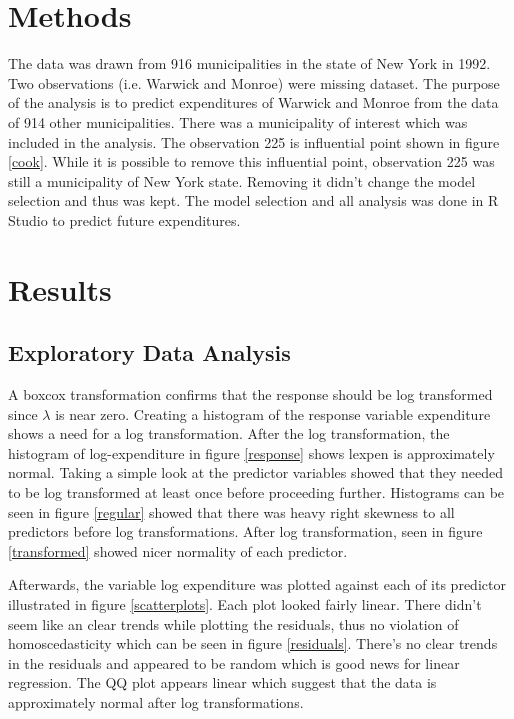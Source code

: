 \documentclass{article}\usepackage[]{graphicx}\usepackage[]{color}
\begin{document}
\section{Methods}

\qquad The data was drawn from 916 municipalities in the state of New York in 1992. Two observations (i.e. Warwick and Monroe) were missing dataset. The purpose of the analysis is to predict expenditures of Warwick and Monroe from the data of 914 other municipalities. There was a municipality of interest which was included in the analysis. The observation 225 is influential point shown in figure \ref{cook}. While it is possible to remove this influential point, observation 225 was still a municipality of New York state. Removing it didn't change the model selection and thus was kept. The model selection and all analysis was done in R Studio to predict future expenditures.

\section{Results}

\subsection{Exploratory Data Analysis}

\qquad A boxcox transformation confirms that the response should be log transformed since $\lambda$ is near zero. Creating a histogram of the response variable expenditure shows a need for a log transformation. After the log transformation, the histogram of log-expenditure in figure \ref{response} shows lexpen is approximately normal. Taking a simple look at the predictor variables showed that they needed to be log transformed at least once before proceeding further. Histograms can be seen in figure \ref{regular} showed that there was heavy right skewness to all predictors before log transformations.  After log transformation, seen in figure \ref{transformed} showed nicer normality of each predictor. 

\quad Afterwards, the variable log expenditure was plotted against each of its predictor illustrated in figure \ref{scatterplots}. Each plot looked fairly linear. There didn't seem like an clear trends while plotting the residuals, thus no violation of homoscedasticity which can be seen in figure \ref{residuals}. There's no clear trends in the residuals and appeared to be random which is good news for linear regression. The QQ plot appears linear which suggest that the data is approximately normal after log transformations. 
\end{document}
